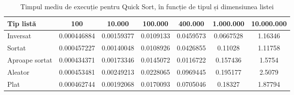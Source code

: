 \documentclass{article}
\begin{document}
\begin{table}[H]
\centering
\begin{tabular}{|l|c|c|c|c|c|c|}
\hline
\textbf{Tip listă} & \textbf{100} & \textbf{10.000} & \textbf{100.000} & \textbf{400.000} & \textbf{1.000.000} & \textbf{10.000.000} \\
\hline
Inversat & 0.000446884 & 0.00159377 & 0.0109133 & 0.0459573 & 0.0667528 & 1.16346 \\
\hline
Sortat & 0.000457227 & 0.00140048 & 0.0108926 & 0.0426855 & 0.11028 & 1.11758 \\
\hline
Aproape sortat & 0.000434371 & 0.00173346 & 0.0145072 & 0.0116722 & 0.157436 & 1.5754 \\
\hline
Aleator & 0.000453481 & 0.00249213 & 0.0228065 & 0.0969445 & 0.195177 & 2.5079 \\
\hline
Plat & 0.000462744 & 0.00192068 & 0.0170093 & 0.0705046 & 0.18327 & 1.87794 \\
\hline
\end{tabular}
\caption{Timpul mediu de execuție pentru Quick Sort, în funcție de tipul și dimensiunea listei}
\label{tab:rezultate-quick}
\end{table}
\end{document}
